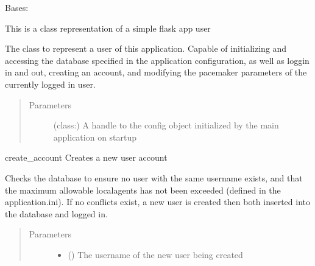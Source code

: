 \documentclass[letterpaper,10pt,english]{sphinxmanual}
\begin{document}
\begin{fulllineitems}
\label{\detokenize{flaskapp.data:flaskapp.data.user.User}}
Bases: 

This is a class representation of a simple flask app user

The class to represent a user of this application.
Capable of initializing and accessing the database
specified in the application configuration, as well
as loggin in and out, creating an account, and
modifying the pacemaker parameters of the currently
logged in user.
\begin{quote}\begin{description}
\item[{Parameters}] \leavevmode
{} (class:) \textendash{} A handle to the  config
object initialized by the main application on startup

\end{description}\end{quote}

\begin{fulllineitems}
\label{\detokenize{flaskapp.data:flaskapp.data.user.User.create_account}}
create\_account Creates a new user account

Checks the database to ensure no user with the same username exists,
and that the maximum allowable local\sphinxhyphen{}agents has not been exceeded
(defined in the application.ini). If no conflicts exist, a new user
is created then both inserted into the database and logged in.
\begin{quote}\begin{description}
\item[{Parameters}] \leavevmode\begin{itemize}
\item {} 
 () \textendash{} The username of the new user being created


\end{itemize}
\end{description}
\end{quote}
\end{fulllineitems}
\end{fulllineitems}
\end{document}
